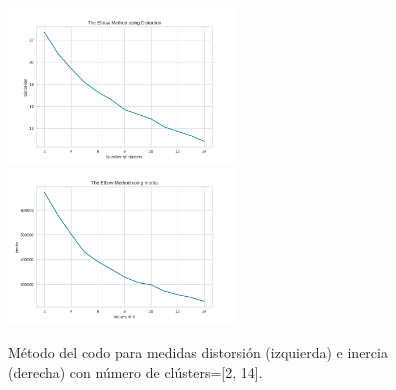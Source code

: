 \documentclass[10pt, a4paper]{article}
\begin{document}
		\begin{figure}[hbt!]
			\centering
			\includegraphics[width = 6cm]{ElbowM_Distortion_bf.png}
			\includegraphics[width = 6cm]{ElbowM_Inertia_bf.png}
			\caption{M\'etodo del codo para medidas distorsi\'on (izquierda) e inercia (derecha) con n\'umero de cl\'usters=[2, 14].}
		\end{figure}
	
\end{document}
